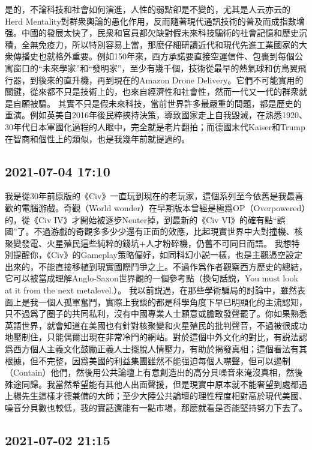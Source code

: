 \documentclass[twocolumn]{ctexart}
\begin{document}
是的，不論科技和社會如何演進，人性的弱點卻是不變的，尤其是人云亦云的Herd Mentality對群衆輿論的愚化作用，反而隨著現代通訊技術的普及而成指數增强。中國的發展太快了，民衆和官員都欠缺對假未來科技騙術的社會記憶和歷史沉積，全無免疫力，所以特別容易上當，那麽仔細研讀近代和現代先進工業國家的大衆傳播史也就格外重要。例如150年來，西方承諾要直接空運信件、包裹到每個公寓窗口的“未來學家”和“發明家”，至少有幾千個，技術從最早的熱氣球和仿鳥翼飛行器，到後來的直升機，再到現在的Amazon Drone Delivery。它們不可能實用的關鍵，從來都不只是技術上的，也來自經濟性和社會性，然而一代又一代的群衆就是自願被騙。
其實不只是假未來科技，當前世界許多最嚴重的問題，都是歷史的重演。例如英美自2016年後民粹挾持決策，導致國家走上自我毀滅，在熟悉1920、30年代日本軍國化過程的人眼中，完全就是老片翻拍；而德國末代Kaiser和Trump在智商和個性上的類似，也是我幾年前就提過的。
\subsection*{2021-07-04 17:10}

我是從30年前原版的《Civ》一直玩到現在的老玩家，這個系列至今依舊是我最喜歡的電腦游戲。奇觀（World wonder）在早期版本曾經是極爲OP（Overpowered）的，從《Civ IV》才開始被逐步Neuter掉，到最新的《Civ VI》的確有點“誤國”了。不過游戲的奇觀多多少少還有正面的效應，比起現實世界中大對撞機、核聚變發電、火星殖民這些純粹的錢坑+人才粉碎機，仍舊不可同日而語。
我想特別提醒你，《Civ》的Gameplay策略偏好，如同科幻小説一樣，也是主觀憑空設定出來的，不能直接移植到現實國際鬥爭之上。不過作爲作者觀察西方歷史的總結，它可以被當成理解Anglo-Saxon世界觀的一個參考點（換句話説，You must look at it from the next metalevel.）。
我以前説過，在那些學術騙局的討論中，雖然表面上是我一個人孤軍奮鬥，實際上我談的都是科學角度下早已明顯化的主流認知，只不過爲了圈子的共同私利，沒有中國專業人士願意或膽敢發聲罷了。你如果熟悉英語世界，就會知道在美國也有針對核聚變和火星殖民的批判聲音，不過被很成功地壓制住，只能偶爾出現在非常冷門的網站。對於這個中外文化的對比，有説法認爲西方個人主義文化鼓勵正義人士擺脫人情壓力，有助於揭發真相；這個看法有其根據，但不完整，因爲美國的利益集團雖然不能强迫每個人噤聲，但可以遏制（Contain）他們，然後用公共論壇上有意創造出的高分貝噪音來淹沒真相，然後殊途同歸。我當然希望能有其他人出面聲援，但是現實中原本就不能奢望到處都遇上楊先生這樣才德兼備的大師；至少大陸公共論壇的理性程度相對高於現代美國、噪音分貝數也較低，我的實話還能有一點市場，那麽就看是否能堅持努力下去了。
\subsection*{2021-07-02 21:15}
\end{document}
